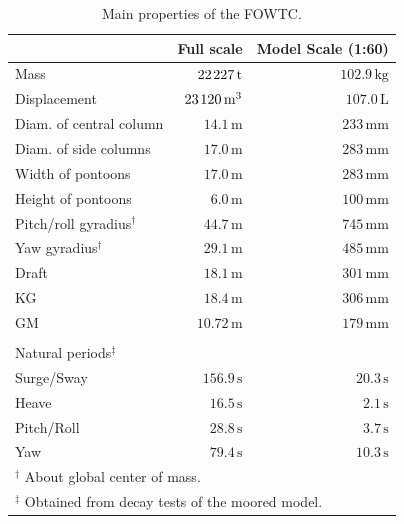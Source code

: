 \begin{table}[pos=h]
	\centering
	\caption{Main properties of the FOWTC.}\label{tab:description_experiment:FOWTC_properties}
	\begin{tabular}{lrr}
		\toprule
		& Full scale & Model Scale (1:60) \\
		\midrule
		Mass & $22 \mkern2mu 227 \, \text{t}$ & $102.9 \, \text{kg}$\\
		Displacement & $23 \mkern2mu 120 \, \text{m}^3$ & $107.0 \, \text{L}$\\
		Diam. of central column & $ 14.1 \, \text{m}$ & $233\,\text{mm}$ \\
		Diam. of side columns & $ 17.0 \, \text{m}$ & $283\,\text{mm}$ \\
		Width of pontoons & $ 17.0 \, \text{m}$ & $283\,\text{mm}$ \\
		Height of pontoons & $ 6.0 \, \text{m}$ & $100\,\text{mm}$ \\
		Pitch/roll gyradius$^\dagger{}$ & $44.7 \, \text{m}$ & $745\,\text{mm}$ \\
		Yaw gyradius$^\dagger{}$ & $29.1 \, \text{m}$ & $485\,\text{mm}$\\
		Draft & $18.1 \, \text{m}$ & $301\,\text{mm}$ \\
		KG & $18.4 \, \text{m}$ & $306 \,\text{mm}$ \\		
		GM & $10.72 \, \text{m}$ & $179 \,\text{mm}$  \\
        \bottomrule
        & & \\[-2pt]
        \toprule
        \multicolumn{3}{l}{Natural periods$^\ddagger{}$} \\ 
		\midrule        
		Surge/Sway & $156.9 \,\text{s}$ & $20.3 \,\text{s}$ \\
		Heave & $16.5 \,\text{s}$ & $2.1 \,\text{s}$ \\
		Pitch/Roll & $28.8 \,\text{s}$  & $3.7 \,\text{s}$\\
		Yaw & $79.4 \,\text{s}$ & $10.3 \,\text{s}$\\
		\bottomrule
        \multicolumn{3}{l}{$^\dagger{}$ {\small About global center of mass.}} \\ 
        \multicolumn{3}{l}{$^\ddagger{}$ {\small Obtained from decay tests of the moored model.}}
	\end{tabular}%
\end{table}%

